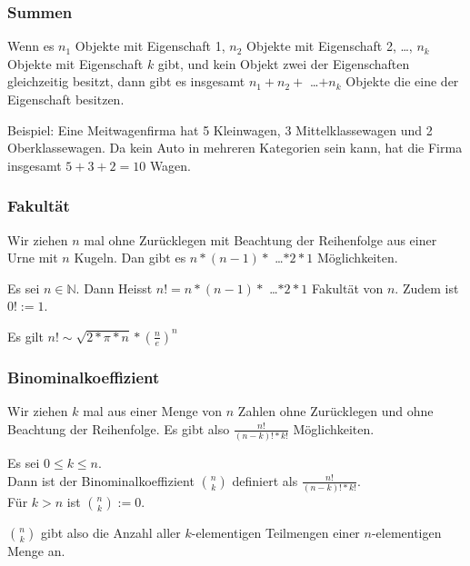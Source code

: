 \documentclass[10pt]{article}
\newtheorem[M]{definition}{Def.}
\newtheorem[M]{satz}{Satz}
\numberwithin{equation}{section}
\newcommand{\NN}{\mathbb{N}} %
\begin{document}
\subsubsection{Summen}
\begin{definition}[Summenregel]
Wenn es $n_1$ Objekte mit Eigenschaft 1, $n_2$ Objekte mit Eigenschaft 2, \dots, $n_k$ Objekte mit Eigenschaft $k$ gibt, und kein Objekt zwei der Eigenschaften gleichzeitig besitzt, dann gibt es insgesamt $n_1+n_2+$ \dots $+n_k$ Objekte die eine der Eigenschaft besitzen.
\end{definition}
Beispiel: Eine Meitwagenfirma hat 5 Kleinwagen, 3 Mittelklassewagen und 2 Oberklassewagen. Da kein Auto in mehreren Kategorien sein kann, hat die Firma insgesamt $5+3+2=10$ Wagen.

\subsubsection{Fakultät}
Wir ziehen $n$ mal ohne Zurücklegen mit Beachtung der Reihenfolge aus einer Urne mit $n$ Kugeln. Dan gibt es $n*(n-1)*$ \dots $*2*1$ Möglichkeiten.
\begin{definition}[Fakultät]
Es sei $n \in \NN$. Dann Heisst $n!=n*(n-1)*$ \dots $*2*1$ Fakultät von $n$. Zudem ist $0! := 1$. 
\end{definition}

Es gilt $n! \sim \sqrt{2*\pi*n}*(\frac{n}{e})^n$

\subsubsection{Binominalkoeffizient}
Wir ziehen $k$ mal aus einer Menge von $n$ Zahlen ohne Zurücklegen und ohne Beachtung der Reihenfolge. Es gibt also $\frac{n!}{(n-k)!*k!}$ Möglichkeiten.
\begin{definition}[Binominalkoeffizient]
Es sei $0 \leq k \leq n$. \\
Dann ist der Binominalkoeffizient $\binom{n}{k}$ definiert als $\frac{n!}{(n-k)!*k!}$. \\
Für $k > n$ ist $\binom{n}{k} := 0$.
\end{definition}
$\binom{n}{k}$ gibt also die Anzahl aller $k$-elementigen Teilmengen einer $n$-elementigen Menge an.
\end{document}
